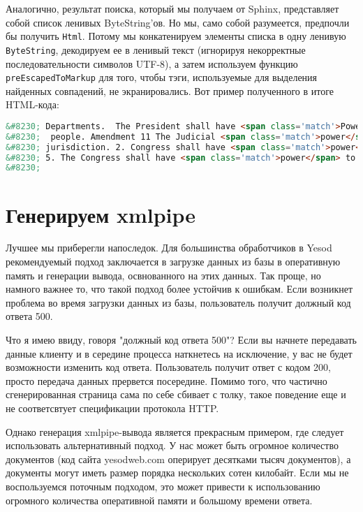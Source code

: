 Аналогично, результат поиска, который мы получаем от Sphinx, представляет собой список ленивых ByteString'ов. Но мы, само собой разумеется, предпочли бы получить \lstinline'Html'. Потому мы конкатенируем элементы списка в одну ленивую \lstinline'ByteString', декодируем ее в ленивый текст (игнорируя некорректные последовательности символов UTF-8), а затем используем функцию \lstinline'preEscapedToMarkup' для того, чтобы тэги, используемые для выделения найденных совпадений, не экранировались. Вот пример полученного в итоге HTML-кода:

\begin{lstlisting}[language=HTML] % TODO: перевести?
&#8230; Departments.  The President shall have <span class='match'>Power</span> to fill up all Vacancies
&#8230;  people. Amendment 11 The Judicial <span class='match'>power</span> of the United States shall
&#8230; jurisdiction. 2. Congress shall have <span class='match'>power</span> to enforce this article by
&#8230; 5. The Congress shall have <span class='match'>power</span> to enforce, by appropriate legislation
&#8230;
\end{lstlisting}

\section{Генерируем xmlpipe} %

Лучшее мы приберегли напоследок. Для большинства обработчиков в Yesod рекомендуемый подход заключается в загрузке данных из базы в оперативную память и генерации вывода, освнованного на этих данных. Так проще, но намного важнее то, что такой подход более устойчив к ошибкам.  Если возникнет проблема во время загрузки данных из базы, пользователь получит должный код ответа 500.

Что я имею ввиду, говоря "должный код ответа 500"? Если вы начнете передавать данные клиенту и в середине процесса наткнетесь на исключение, у вас не будет возможности изменить код ответа. Пользователь получит ответ с кодом 200, просто передача данных прервется посередине. Помимо того, что частично сгенерированная страница сама по себе сбивает с толку, такое поведение еще и не соответсвтует спецификации протокола HTTP.

Однако генерация xmlpipe-вывода является прекрасным примером, где следует использовать альтернативный подход. У нас может быть огромное количество документов (код сайта yesodweb.com оперирует десятками тысяч документов), а документы могут иметь размер порядка нескольких сотен килобайт. Если мы не воспользуемся поточным подходом, это может привести к использованию огромного количества оперативной памяти и большому времени ответа.

